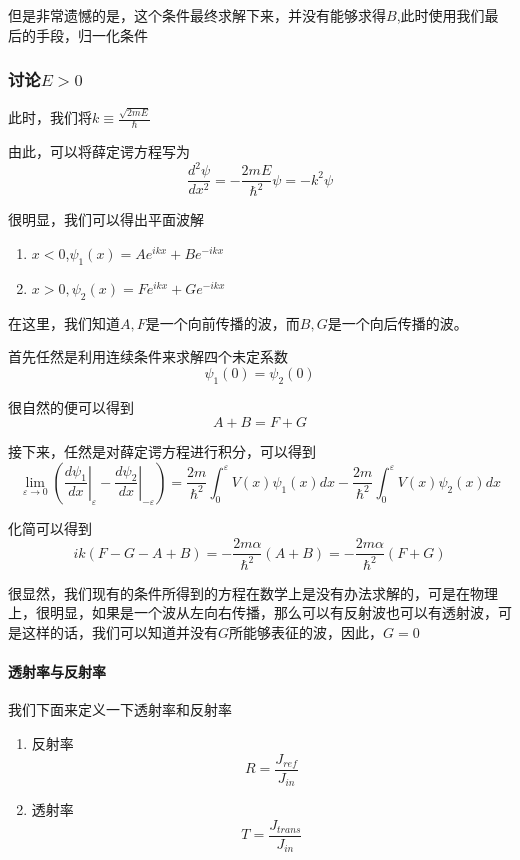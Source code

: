 \documentclass{article}
\begin{document}
但是非常遗憾的是，这个条件最终求解下来，并没有能够求得$B$,此时使用我们最后的手段，归一化条件




\subsubsection{讨论$E>0$}

此时，我们将$k\equiv \frac{\sqrt{2mE}}{\hbar}$

由此，可以将薛定谔方程写为
\[
	\frac{d^2\psi}{dx^2}=-\frac{2mE}{\hbar^2}\psi=-k^2\psi
\]

很明显，我们可以得出平面波解
\begin{center}
	\begin{enumerate}
		\item $x<0$,$\psi_1(x)=Ae^{ikx}+Be^{-ikx}$
		\item $x>0,\psi_2(x)=Fe^{ikx}+Ge^{-ikx}$
	\end{enumerate}
\end{center}


在这里，我们知道$A,F$是一个向前传播的波，而$B,G$是一个向后传播的波。

首先任然是利用连续条件来求解四个未定系数
\[\psi_1(0)=\psi_2(0)\]

很自然的便可以得到
\[A+B=F+G\]

接下来，任然是对薛定谔方程进行积分，可以得到
\[
	\lim_{\varepsilon\to0}\left(\left.\frac{d\psi_1}{dx}\right|_{\varepsilon}-\left.\frac{d\psi_2}{dx}\right|_{-\varepsilon}\right)=\frac{2m}{\hbar^2}\int_{0}^{\varepsilon}V(x)\psi_1(x)dx-\frac{2m}{\hbar^2}\int_{0}^{\varepsilon}V(x)\psi_2(x)dx
\]

化简可以得到
\[ik(F-G-A+B)=-\frac{2m\alpha}{\hbar^2}(A+B)=-\frac{2m\alpha}{\hbar^2}(F+G)\]

很显然，我们现有的条件所得到的方程在数学上是没有办法求解的，可是在物理上，很明显，如果是一个波从左向右传播，那么可以有反射波也可以有透射波，可是这样的话，我们可以知道并没有$G$所能够表征的波，因此，$G=0$


\paragraph{透射率与反射率}

我们下面来定义一下透射率和反射率
\begin{enumerate}
	\item 反射率\[R=\frac{J_{ref}}{J_{in}}\]
	\item 透射率\[T=\frac{J_{trans}}{J_{in}}\]
\end{enumerate}
\end{document}
